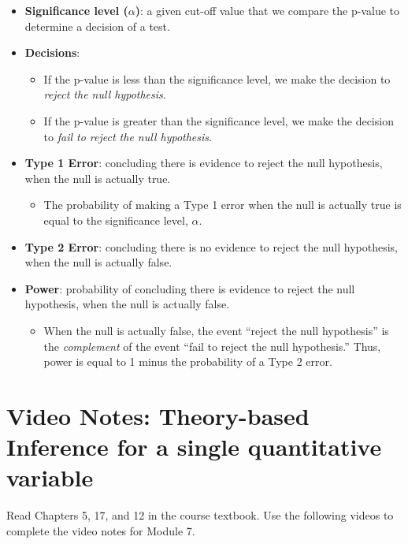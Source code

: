 \documentclass[
]{report}
\providecommand{\tightlist}{%
  \setlength{\itemsep}{0pt}\setlength{\parskip}{0pt}}
\begin{document}
\begin{itemize}
\item
  \textbf{Significance level (\(\alpha\))}: a given cut-off value that we compare the p-value to determine a decision of a test.
\item
  \textbf{Decisions}:

  \begin{itemize}
  \item
    If the p-value is less than the significance level, we make the decision to \emph{reject the null hypothesis}.
  \item
    If the p-value is greater than the significance level, we make the decision to \emph{fail to reject the null hypothesis}.
  \end{itemize}
\item
  \textbf{Type 1 Error}: concluding there is evidence to reject the null hypothesis, when the null is actually true.

  \begin{itemize}
  \tightlist
  \item
    The probability of making a Type 1 error when the null is actually true is equal to the significance level, \(\alpha\).
  \end{itemize}
\item
  \textbf{Type 2 Error}: concluding there is no evidence to reject the null hypothesis, when the null is actually false.
\item
  \textbf{Power}: probability of concluding there is evidence to reject the null hypothesis, when the null is actually false.

  \begin{itemize}
  \tightlist
  \item
    When the null is actually false, the event ``reject the null hypothesis'' is the \emph{complement} of the event ``fail to reject the null hypothesis.'' Thus, power is equal to 1 minus the probability of a Type 2 error.
  \end{itemize}
\end{itemize}

\newpage

\section{Video Notes: Theory-based Inference for a single quantitative variable}\label{video-notes-theory-based-inference-for-a-single-quantitative-variable}

Read Chapters 5, 17, and 12 in the course textbook. Use the following videos to complete the video notes for Module 7.
\end{document}

